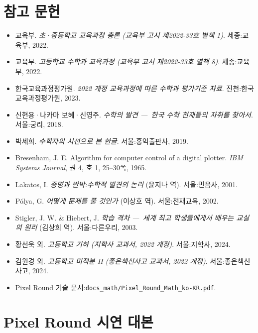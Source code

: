 \documentclass[12pt,a4paper]{scrartcl}
\begin{document}
\section{참고 문헌}

\begin{itemize}[leftmargin=1.3em,itemsep=0.2em,topsep=0.3em]
  \item 교육부. \emph{초·중등학교 교육과정 총론 (교육부 고시 제2022-33호 별책 1)}. 세종:교육부, 2022.
  \item 교육부. \emph{고등학교 수학과 교육과정 (교육부 고시 제2022-33호 별책 8)}. 세종:교육부, 2022.
  \item 한국교육과정평가원. \emph{2022 개정 교육과정에 따른 수학과 평가기준 자료}. 진천:한국교육과정평가원, 2023.
  \item 신현용·나카마 보혜·신영주. \emph{수학의 발견 ---\, 한국 수학 천재들의 자취를 찾아서}. 서울:궁리, 2018.
  \item 박세희. \emph{수학자의 시선으로 본 한글}. 서울:홍익출판사, 2019.
  \item Bresenham, J. E. Algorithm for computer control of a digital plotter. \emph{IBM Systems Journal}, 권 4, 호 1, 25--30쪽, 1965.
  \item Lakatos, I. \emph{증명과 반박:수학적 발견의 논리} (윤지나 역). 서울:민음사, 2001.
  \item Pólya, G. \emph{어떻게 문제를 풀 것인가} (이상호 역). 서울:천재교육, 2002.
  \item Stigler, J. W. \& Hiebert, J. \emph{학습 격차 ---\, 세계 최고 학생들에게서 배우는 교실의 원리} (김상희 역). 서울:다른우리, 2003.
  \item 황선욱 외. \emph{고등학교 기하 (지학사 교과서, 2022 개정)}. 서울:지학사, 2024.
  \item 김원경 외. \emph{고등학교 미적분 II (좋은책신사고 교과서, 2022 개정)}. 서울:좋은책신사고, 2024.
  \item Pixel Round 기술 문서:\texttt{docs\_math/Pixel\_Round\_Math\_ko-KR.pdf}.
\end{itemize}

\newpage
\appendix
\renewcommand{\thesection}{\Alph{section}}
\setcounter{section}{0}

\section{Pixel Round 시연 대본}\label{ap:demo}
\end{document}
